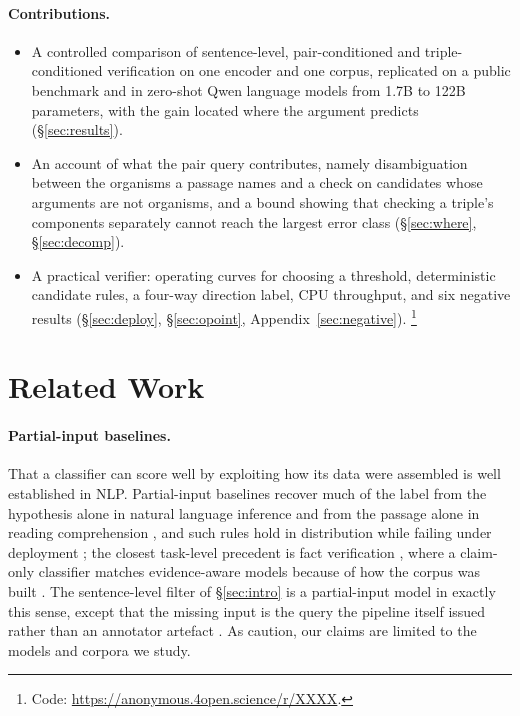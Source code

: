 \documentclass[11pt]{article}
\begin{document}
\paragraph{Contributions.}
\begin{itemize}\itemsep1pt\parskip0pt
\item A controlled comparison of sentence-level, pair-conditioned and triple-conditioned
      verification on one encoder and one corpus, replicated on a public benchmark and in zero-shot
      Qwen language models from 1.7B to 122B parameters, with the gain located where the argument
      predicts (\S\ref{sec:results}).
\item An account of what the pair query contributes, namely disambiguation between the organisms a passage
      names and a check on candidates whose arguments are not organisms, and a bound showing that
      checking a triple's components separately cannot reach the largest error class
      (\S\ref{sec:where}, \S\ref{sec:decomp}).
\item A practical verifier: operating curves for choosing a threshold, deterministic
      candidate rules, a four-way direction label, CPU throughput, and six negative results
      (\S\ref{sec:deploy}, \S\ref{sec:opoint}, Appendix~\ref{sec:negative}).%
\footnote{Code: \url{https://anonymous.4open.science/r/XXXX}.}
\end{itemize}

\section{Related Work}
\label{sec:related}

\paragraph{Partial-input baselines.}
That a classifier can score well by exploiting how its data were assembled is well established in
NLP. Partial-input baselines recover much of the label from the hypothesis alone in natural language
inference
\citep{gururangan-etal-2018-annotation,poliak-etal-2018-hypothesis} and from the passage alone in
reading comprehension \citep{kaushik-lipton-2018-much}, and such rules hold in distribution while
failing under deployment \citep{geirhos-etal-2020-shortcut,du-etal-2024-shortcut}; the closest
task-level precedent is fact verification \citep{thorne2018fever}, where a claim-only classifier
matches evidence-aware models because of how the corpus was built
\citep{schuster-etal-2019-towards}. The sentence-level filter of \S\ref{sec:intro} is a
partial-input model in exactly this sense, except that the missing input is the query the pipeline
itself issued rather than an annotator artefact
\citep{wiegand-etal-2019-detection,parmar-etal-2023-dont}. As \citet{feng-etal-2019-misleading}
caution, our claims are limited to the models and corpora we study.
\end{document}
